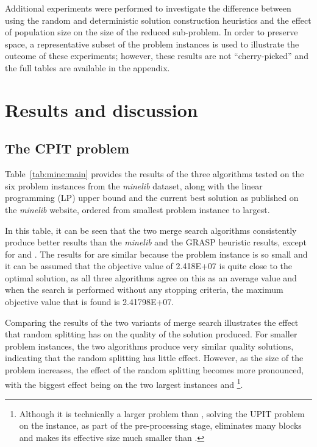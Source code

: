 \documentclass[journal]{IEEEtran}
\begin{document}

Additional experiments were performed to investigate the difference between using the random and deterministic solution construction heuristics and the effect of population size on the size of the reduced sub-problem. In order to preserve space, a representative subset of the problem instances is used to illustrate the outcome of these experiments; however, these results are not ``cherry-picked'' and the full tables are available in the appendix. 

\section{Results and discussion}\label{sec:results}
\subsection{The CPIT problem}
Table~\ref{tab:mine:main} provides the results of the three algorithms tested on the six problem instances from the \emph{minelib} dataset, along with the linear programming (LP) upper bound and the current best solution as published on the \emph{minelib} website, ordered from smallest problem instance to largest.

In this table, it can be seen that the two merge search algorithms consistently produce better results than the \emph{minelib} and the GRASP heuristic results, except for \newman{} and \zucklarge{}. The results for \newman{} are similar because the problem instance is so small and it can be assumed that the objective value of 2.418E+07 is quite close to the optimal solution, as all three algorithms agree on this as an average value and when the search is performed without any stopping criteria, the maximum objective value that is found is 2.41798E+07.

Comparing the results of the two variants of merge search illustrates the effect that random splitting has on the quality of the solution produced. For smaller problem instances, the two algorithms produce very similar quality solutions, indicating that the random splitting has little effect. 
However, as the size of the problem increases, the effect of the random splitting becomes more pronounced, with the biggest effect being on the two largest instances \zuckmed{} and \zucklarge{}\footnote{Although it is technically a larger problem than \zuckmed, solving the UPIT problem on the \marvin{} instance, as part of the pre-processing stage, eliminates many blocks and makes its effective size much smaller than \zuckmed.}. 
\end{document}
